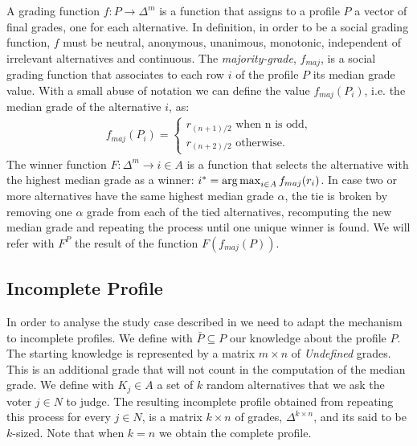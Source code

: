 \documentclass[version=3.21, pagesize, twoside=off, bibliography=totoc, DIV=calc, fontsize=12pt, a4paper]{scrartcl}
\begin{document}
A grading function $f: P \rightarrow \Delta^m$ is a function that assigns to a profile $P$ a vector of final grades, one for each alternative. In \citet{Balinski2007} definition, in order to be a social grading function, $f$ must be neutral, anonymous, unanimous, monotonic, independent of irrelevant alternatives and continuous. 
The \emph{majority-grade}, $f_{maj}$, is a social grading function that associates to each row $i$ of the profile $P$ its median grade value. With a small abuse of notation we can define the value $f_{maj}(P_i)$, i.e. the median grade of the alternative $i$, as:
\begin{align}
	f_{maj}(P_i) = \begin{cases}
		r_{(n+1)/2} \text{ when n is odd,} \\
		r_{(n+2)/2} \text{ otherwise.}
	\end{cases}
\end{align}
The winner function $F:\Delta^{m} \rightarrow i\in A$ is a function that selects the alternative with the highest median grade as a winner: $i^* = \operatorname*{arg\,max}_{i\in A}f_{maj}(r_i)$. In case two or more alternatives have the same highest median grade $\alpha$, the tie is broken by removing one $\alpha$ grade from each of the tied alternatives, recomputing the new median grade and repeating the process until one unique winner is found. We will refer with $F^P$ the result of the function $F(f_{maj}(P))$.

\subsection{Incomplete Profile}
In order to analyse the study case described in  we need to adapt the mechanism to incomplete profiles. We define with $\bar{P} \subseteq P$ our knowledge about the profile $P$. %
The starting knowledge is represented by a matrix $m\times n$ of \textit{Undefined} grades. This is an additional grade that will not count in the computation of the median grade. We define with $K_j \in A$ a set of $k$ random alternatives that we ask the voter $j\in N$ to judge. The resulting incomplete profile obtained from repeating this process for every $j \in N$, is a matrix $k \times n$ of grades, $\Delta^{k\times n}$, and its said to be $k$-sized. Note that when $k=n$ we obtain the complete profile.
\end{document}
